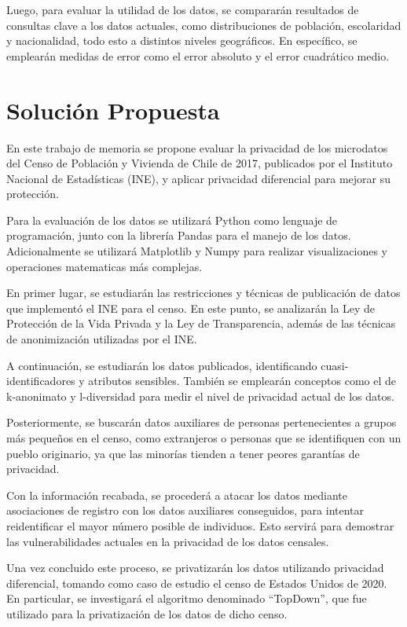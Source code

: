 \documentclass[informe]{upropuesta}
\begin{document}
Luego, para evaluar la utilidad de los datos, se compararán resultados de consultas clave a los datos actuales, como distribuciones de población, escolaridad y nacionalidad, todo esto a distintos niveles geográficos. En específico, se emplearán medidas de error como el error absoluto y el error cuadrático medio.

\section{Solución Propuesta}\label{sec:sol}

En este trabajo de memoria se propone evaluar la privacidad de los microdatos del Censo de Población y Vivienda de Chile de 2017, publicados por el Instituto Nacional de Estadísticas (INE), y aplicar privacidad diferencial para mejorar su protección.

Para la evaluación de los datos se utilizará Python como lenguaje de programación, junto con la librería Pandas para el manejo de los datos. Adicionalmente se utilizará Matplotlib y Numpy para realizar visualizaciones y operaciones matematicas más complejas.

En primer lugar, se estudiarán las restricciones y técnicas de publicación de datos que implementó el INE para el censo. En este punto, se analizarán la Ley de Protección de la Vida Privada y la Ley de Transparencia, además de las técnicas de anonimización utilizadas por el INE.

A continuación, se estudiarán los datos publicados, identificando cuasi-identificadores y atributos sensibles. También se emplearán conceptos como el de k-anonimato y l-diversidad para medir el nivel de privacidad actual de los datos.

Posteriormente, se buscarán datos auxiliares de personas pertenecientes a grupos más pequeños en el censo, como extranjeros o personas que se identifiquen con un pueblo originario, ya que las minorías tienden a tener peores garantías de privacidad.

Con la información recabada, se procederá a atacar los datos mediante asociaciones de registro con los datos auxiliares conseguidos, para intentar reidentificar el mayor número posible de individuos. Esto servirá para demostrar las vulnerabilidades actuales en la privacidad de los datos censales.

Una vez concluido este proceso, se privatizarán los datos utilizando privacidad diferencial, tomando como caso de estudio el censo de Estados Unidos de 2020. En particular, se investigará el algoritmo denominado “TopDown”, que fue utilizado para la privatización de los datos de dicho censo.
\end{document}
